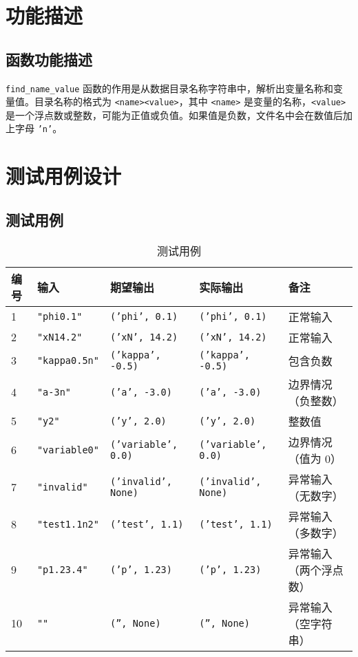 \documentclass{article}
\begin{document}
	\section*{功能描述}

\subsection*{函数功能描述}
\texttt{find\_name\_value} 函数的作用是从数据目录名称字符串中，解析出变量名称和变量值。目录名称的格式为 \texttt{<name><value>}，其中 \texttt{<name>} 是变量的名称，\texttt{<value>} 是一个浮点数或整数，可能为正值或负值。如果值是负数，文件名中会在数值后加上字母 \texttt{'n'}。

\section*{测试用例设计}

\subsection*{测试用例}

\begin{table}[htbp]
	\centering
	\begin{tabular}{@{}lllll@{}}
		\toprule
		\textbf{编号} & \textbf{输入} & \textbf{期望输出} & \textbf{实际输出} & \textbf{备注} \\
		\midrule
		1 & \texttt{"phi0.1"} & \texttt{('phi', 0.1)} & \texttt{('phi', 0.1)} & 正常输入 \\
		2 & \texttt{"xN14.2"} & \texttt{('xN', 14.2)} & \texttt{('xN', 14.2)} & 正常输入 \\
		3 & \texttt{"kappa0.5n"} & \texttt{('kappa', -0.5)} & \texttt{('kappa', -0.5)} & 包含负数 \\
		4 & \texttt{"a-3n"} & \texttt{('a', -3.0)} & \texttt{('a', -3.0)} & 边界情况（负整数） \\
		5 & \texttt{"y2"} & \texttt{('y', 2.0)} & \texttt{('y', 2.0)} & 整数值 \\
		6 & \texttt{"variable0"} & \texttt{('variable', 0.0)} & \texttt{('variable', 0.0)} & 边界情况（值为 0） \\
		7 & \texttt{"invalid"} & \texttt{('invalid', None)} & \texttt{('invalid', None)} & 异常输入（无数字） \\
		8 & \texttt{"test1.1n2"} & \texttt{('test', 1.1)} & \texttt{('test', 1.1)} & 异常输入（多数字） \\
		9 & \texttt{"p1.23.4"} & \texttt{('p', 1.23)} & \texttt{('p', 1.23)} & 异常输入（两个浮点数） \\
		10 & \texttt{""} & \texttt{('', None)} & \texttt{('', None)} & 异常输入（空字符串） \\
		\bottomrule
	\end{tabular}
	\caption{测试用例}
\end{table}
\end{document}
